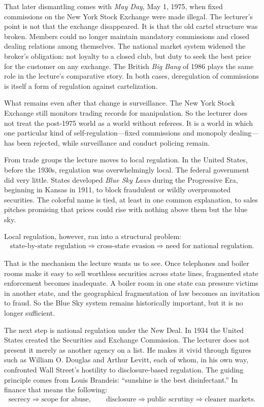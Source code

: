 That later dismantling comes with \emph{May Day}, May 1, 1975, when fixed commissions on the New York Stock Exchange were made illegal. The lecturer's point is not that the exchange disappeared. It is that the old cartel structure was broken. Members could no longer maintain mandatory commissions and closed dealing relations among themselves. The national market system widened the broker's obligation: not loyalty to a closed club, but duty to seek the best price for the customer on any exchange. The British \emph{Big Bang} of 1986 plays the same role in the lecture's comparative story. In both cases, deregulation of commissions is itself a form of regulation against cartelization.

What remains even after that change is surveillance. The New York Stock Exchange still monitors trading records for manipulation. So the lecturer does not treat the post-1975 world as a world without referees. It is a world in which one particular kind of self-regulation---fixed commissions and monopoly dealing---has been rejected, while surveillance and conduct policing remain.

From trade groups the lecture moves to local regulation. In the United States, before the 1930s, regulation was overwhelmingly local. The federal government did very little. States developed \emph{Blue Sky Laws} during the Progressive Era, beginning in Kansas in 1911, to block fraudulent or wildly overpromoted securities. The colorful name is tied, at least in one common explanation, to sales pitches promising that prices could rise with nothing above them but the blue sky.

Local regulation, however, ran into a structural problem:
\begin{align}
\text{state-by-state regulation}
\Rightarrow
\text{cross-state evasion}
\Rightarrow
\text{need for national regulation}.
\end{align}

That is the mechanism the lecture wants us to see. Once telephones and boiler rooms make it easy to sell worthless securities across state lines, fragmented state enforcement becomes inadequate. A boiler room in one state can pressure victims in another state, and the geographical fragmentation of law becomes an invitation to fraud. So the Blue Sky system remains historically important, but it is no longer sufficient.

The next step is national regulation under the New Deal. In 1934 the United States created the Securities and Exchange Commission. The lecturer does not present it merely as another agency on a list. He makes it vivid through figures such as William O. Douglas and Arthur Levitt, each of whom, in his own way, confronted Wall Street's hostility to disclosure-based regulation. The guiding principle comes from Louis Brandeis: ``sunshine is the best disinfectant.'' In finance that means the following:
\begin{align}
\text{secrecy}
\Rightarrow
\text{scope for abuse},
\qquad
\text{disclosure}
\Rightarrow
\text{public scrutiny}
\Rightarrow
\text{cleaner markets}.
\end{align}

